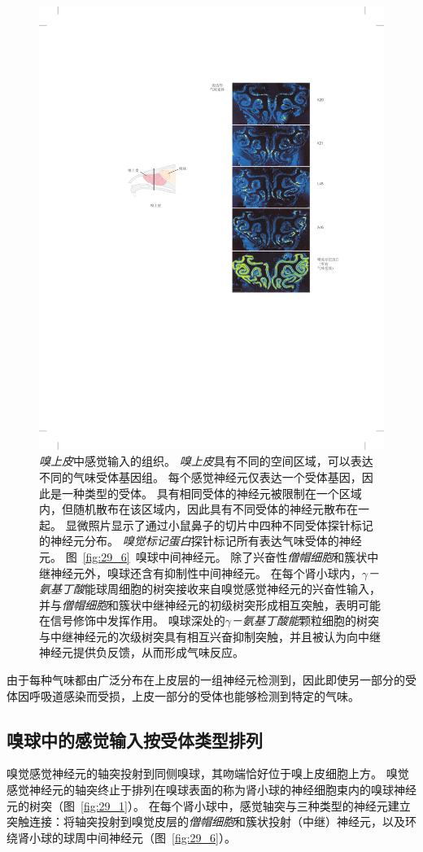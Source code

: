 \begin{figure}[htbp]
	\centering
	\includegraphics[width=0.5\linewidth]{chap29/fig_29_5}
	\caption{\textit{嗅上皮}中感觉输入的组织。
		\textit{嗅上皮}具有不同的空间区域，可以表达不同的气味受体基因组。
		每个感觉神经元仅表达一个受体基因，因此是一种类型的受体。
		具有相同受体的神经元被限制在一个区域内，但随机散布在该区域内，因此具有不同受体的神经元散布在一起。
		显微照片显示了通过小鼠鼻子的切片中四种不同受体探针标记的神经元分布。
		\textit{嗅觉标记蛋白}探针标记所有表达气味受体的神经元\cite{ressler1993zonal}。
		图~\ref{fig:29_6}~嗅球中间神经元。
		除了兴奋性\textit{僧帽细胞}和簇状中继神经元外，嗅球还含有抑制性中间神经元。
		在每个肾小球内，\textit{$\gamma$－氨基丁酸}能球周细胞的树突接收来自嗅觉感觉神经元的兴奋性输入，并与\textit{僧帽细胞}和簇状中继神经元的初级树突形成相互突触，表明可能在信号修饰中发挥作用。
		嗅球深处的\textit{$\gamma$－氨基丁酸能}颗粒细胞的树突与中继神经元的次级树突具有相互兴奋抑制突触，并且被认为向中继神经元提供负反馈，从而形成气味反应\cite{haberly1998synaptic}。}
	\label{fig:29_5}
\end{figure}


由于每种气味都由广泛分布在上皮层的一组神经元检测到，因此即使另一部分的受体因呼吸道感染而受损，上皮一部分的受体也能够检测到特定的气味。



\subsection{嗅球中的感觉输入按受体类型排列}

嗅觉感觉神经元的轴突投射到同侧嗅球，其吻端恰好位于嗅上皮细胞上方。
嗅觉感觉神经元的轴突终止于排列在嗅球表面的称为肾小球的神经细胞束内的嗅球神经元的树突（图~\ref{fig:29_1}）。
在每个肾小球中，感觉轴突与三种类型的神经元建立突触连接：将轴突投射到嗅觉皮层的\textit{僧帽细胞}和簇状投射（中继）神经元，以及环绕肾小球的球周中间神经元（图~\ref{fig:29_6}）。


